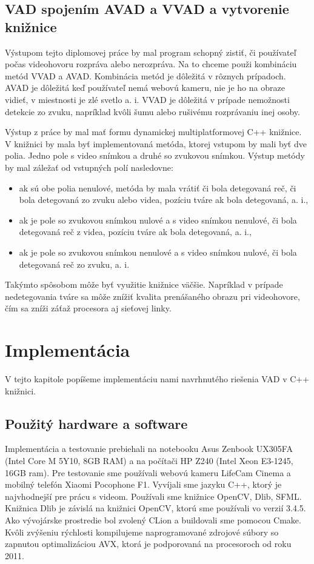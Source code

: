 \section{VAD spojením AVAD a VVAD a vytvorenie knižnice}
Výstupom tejto diplomovej práce by mal program schopný zistiť, či používateľ počas videohovoru rozpráva alebo nerozpráva. 
Na to chceme použi kombináciu metód VVAD a AVAD. 
Kombinácia metód je dôležitá v rôznych prípadoch. 
AVAD je dôležitá keď používateľ nemá webovú kameru, nie je ho na obraze vidieť, v miestnosti je zlé svetlo a. i.
VVAD je dôležitá v prípade nemožnosti detekcie zo zvuku, napríklad kvôli šumu alebo rušivému rozprávaniu inej osoby.

Výstup z práce by mal mať formu dynamickej multiplatformovej C++ knižnice. 
V knižnici by mala byť implementovaná metóda, ktorej vstupom by mali byť dve polia. 
Jedno pole s video snímkou a druhé so zvukovou snímkou.
Výstup metódy by mal záležať od vstupných polí nasledovne:
\begin{itemize}
	\item ak sú obe polia nenulové, metóda by mala vrátiť či bola detegovaná reč, či bola detegovaná zo zvuku alebo videa, pozíciu tváre ak bola detegovaná, a. i., 
	\item ak je pole so zvukovou snímkou nulové a s video snímkou nenulové, či bola detegovaná reč z videa, pozíciu tváre ak bola detegovaná, a. i.,
	\item ak je pole so zvukovou snímkou nenulové a s video snímkou nulové, či bola detegovaná reč zo zvuku, a. i.
\end{itemize}
Takýmto spôsobom môže byť využitie knižnice väčšie.
Napríklad v prípade nedetegovania tváre sa môže znížiť kvalita prenášaného obrazu pri videohovore, čím sa zníži záťaž procesora aj sieťovej linky.

\chapter{Implementácia}
V tejto kapitole popíšeme implementáciu nami navrhnutého riešenia VAD v C++ knižnici.

\section{Použitý hardware a software}
Implementácia a testovanie prebiehali na notebooku Asus Zenbook UX305FA (Intel Core M 5Y10, 8GB RAM) a na počítači HP Z240 (Intel Xeon E3-1245, 16GB ram).
Pre testovanie sme používali webovú kameru LifeCam Cinema a mobilný telefón Xiaomi Pocophone F1.
Vyvíjali sme jazyku C++, ktorý je najvhodnejší pre prácu s videom.
Používali sme knižnice OpenCV, Dlib, SFML.
Knižnica Dlib je závislá na knižnici OpenCV, ktorú sme používali vo verzií 3.4.5.
Ako vývojárske prostredie bol zvolený CLion a buildovali sme pomocou Cmake.
Kvôli zvýšeniu rýchlosti kompilujeme naprogramované zdrojové súbory so zapnutou optimalizáciou AVX, ktorá je podporovaná na procesoroch od roku 2011.

